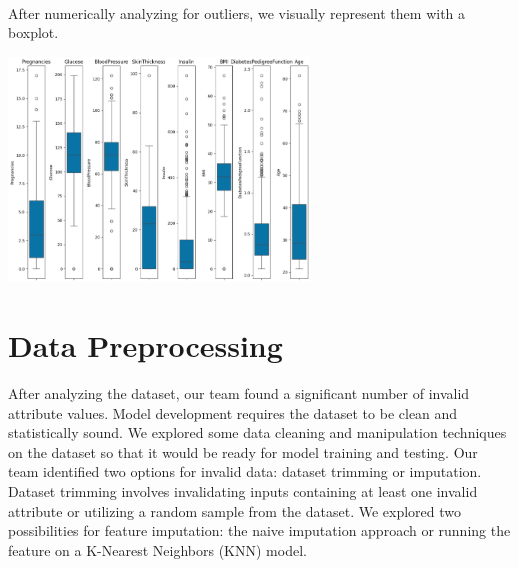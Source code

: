 \documentclass[journal]{IEEEtran}
\begin{document}
\\

After numerically analyzing for outliers, we visually represent them with a boxplot.

\begin{center}
    \includegraphics[width=8cm]{BOX.png}
\end{center}

\section{Data Preprocessing}

After analyzing the dataset, our team found a significant number of invalid attribute values. Model development requires the dataset to be clean and statistically sound. We explored some data cleaning and manipulation techniques on the dataset so that it would be ready for model training and testing. Our team identified two options for invalid data: dataset trimming or imputation. Dataset trimming involves invalidating inputs containing at least one invalid attribute or utilizing a random sample from the dataset. We explored two possibilities for feature imputation: the naive imputation approach or running the feature on a K-Nearest Neighbors (KNN) model.
\end{document}

